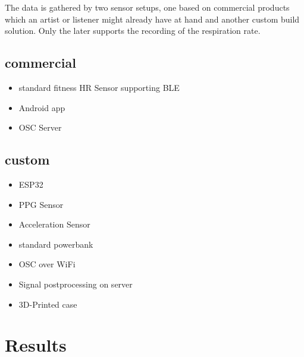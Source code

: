 \documentclass{sigchi-ext}
\begin{document}
The data is gathered by two sensor setups, one based on commercial products which an artist or
listener might already have at hand and another custom build solution. Only the later supports
the recording of the respiration rate.

\subsection{commercial}
\begin{itemize}
  \item standard fitness HR Sensor supporting BLE
  \item Android app
  \item OSC Server
\end{itemize}

\subsection{custom}
\begin{itemize}
  \item ESP32
  \item PPG Sensor
  \item Acceleration Sensor
  \item standard powerbank
  \item OSC over WiFi
  \item Signal postprocessing on server
  \item 3D-Printed case
\end{itemize}

\section{Results}



\balance{} 



\end{document}
